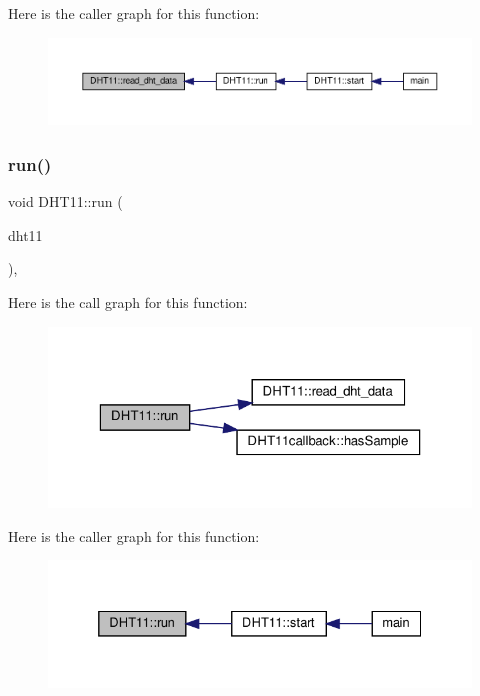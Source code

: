 Here is the caller graph for this function\+:
\nopagebreak
\begin{figure}[H]
\begin{center}
\leavevmode
\includegraphics[width=350pt]{classDHT11_abf4c039a75c0458ee45621c12feec0c7_icgraph}
\end{center}
\end{figure}
\mbox{\label{classDHT11_ae1a44c906a97ff4398d4d6721a1c8780}} 
\subsubsection{\texorpdfstring{run()}{run()}}
{\footnotesize\ttfamily void D\+H\+T11\+::run (\begin{DoxyParamCaption}\item[{\hyperlink{classDHT11}{D\+H\+T11} $\ast$}]{dht11 }\end{DoxyParamCaption})\hspace{0.3cm}{\ttfamily [static]}, {\ttfamily [private]}}

Here is the call graph for this function\+:
\nopagebreak
\begin{figure}[H]
\begin{center}
\leavevmode
\includegraphics[width=323pt]{classDHT11_ae1a44c906a97ff4398d4d6721a1c8780_cgraph}
\end{center}
\end{figure}
Here is the caller graph for this function\+:
\nopagebreak
\begin{figure}[H]
\begin{center}
\leavevmode
\includegraphics[width=332pt]{classDHT11_ae1a44c906a97ff4398d4d6721a1c8780_icgraph}
\end{center}
\end{figure}
\mbox{\label{classDHT11_aa39533ef269048f791167e05598757fe}} 
